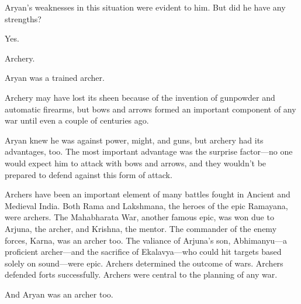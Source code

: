Aryan's weaknesses in this situation were evident to him. But did he have any
strengths?

Yes.

Archery.

Aryan was a trained archer.

Archery may have lost its sheen because of the invention of gunpowder and automatic
firearms, but bows and arrows formed an important component of any war
until even a couple of centuries ago.

Aryan knew he was against power, might, and guns, but archery had its advantages,
too. The most important advantage was the surprise factor—no one would expect
him to attack with bows and arrows, and they wouldn't be prepared to defend
against this form of attack.

Archers have been an important element of many battles fought in Ancient and
Medieval India. Both Rama and Lakshmana, the heroes of the epic Ramayana, were
archers. The Mahabharata War, another famous epic, was won due to Arjuna, the
archer, and Krishna, the mentor. The commander of the enemy forces, Karna, was an
archer too. The valiance of Arjuna's son, Abhimanyu—a proficient archer—and
the sacrifice of Ekalavya—who could hit targets based solely on sound—were
epic. Archers determined the outcome of wars. Archers defended forts successfully.
Archers were central to the planning of any war.

And Aryan was an archer too.